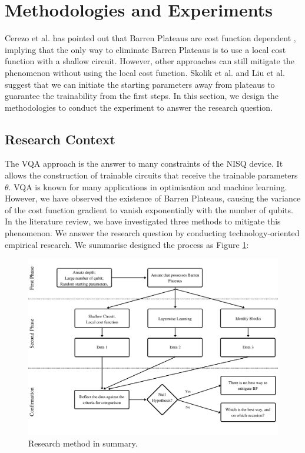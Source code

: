 \section{Methodologies and Experiments}
Cerezo et al. has pointed out that Barren Plateaus are cost function dependent \cite{cerezoCostFunctionDependent2021}, implying that the only way to eliminate Barren Plateaus is to use a local cost function with a shallow circuit.
However, other approaches can still mitigate the phenomenon without using the local cost function.
Skolik et al. and Liu et al. \cite{skolikLayerwiseLearningQuantum2021, liuParameterInitializationMethod2021} suggest that we can initiate the starting parameters away from plateaus to guarantee the trainability from the first steps.
In this section, we design the methodologies to conduct the experiment to answer the research question.

\subsection{Research Context}
The VQA approach is the answer to many constraints of the NISQ device. It allows the construction of trainable circuits that receive the trainable parameters $\theta$. 
VQA is known for many applications in optimisation and machine learning. 
However, we have observed the existence of Barren Plateaus, causing the variance of the cost function gradient to vanish exponentially with the number of qubits.
In the literature review, we have investigated three methods \cite{cerezoCostFunctionDependent2021, liuParameterInitializationMethod2021, skolikLayerwiseLearningQuantum2021} to mitigate this phenomenon.
We answer the research question by conducting technology-oriented empirical research. 
We summarise designed the process as Figure \ref{Research Activities}:

\begin{figure}
    \centering
    \includegraphics[width=\textwidth]{./ResearchDesign/Appendices/Method.png}
    \caption{
        Research method in summary.
    }
    \label{Research Activities}
\end{figure}

